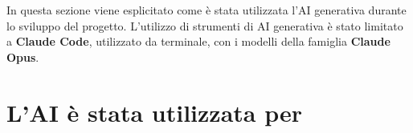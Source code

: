 
\label{cap:dichiarazione-ai}

In questa sezione viene esplicitato come è stata utilizzata l'AI generativa durante lo sviluppo del progetto. L'utilizzo di strumenti di AI generativa è stato limitato a \textbf{Claude Code}, utilizzato da terminale, con i modelli della famiglia \textbf{Claude Opus}.

\section*{L'AI è stata utilizzata per}

